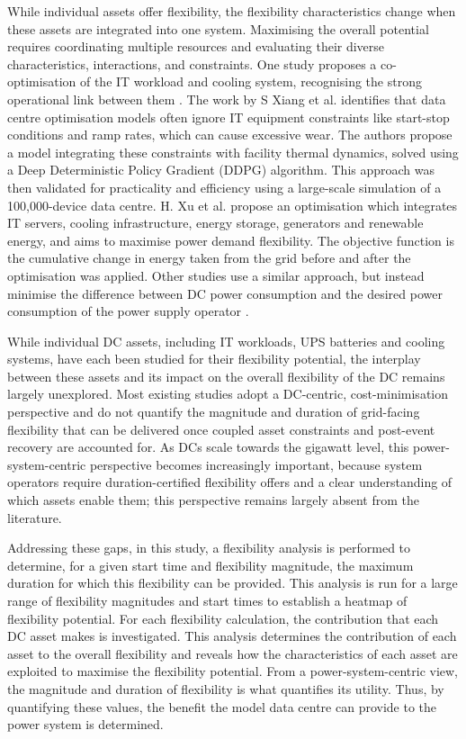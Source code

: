 \documentclass[lettersize,journal]{IEEEtran}
\newcommand{\rev}[1]{\textcolor{blue!70!black}{#1}}
\begin{document}
While individual assets offer flexibility, the flexibility characteristics change when these assets are integrated into one system. Maximising the overall potential requires coordinating multiple resources and evaluating their diverse characteristics, interactions, and constraints. One study proposes a co-optimisation of the IT workload and cooling system, recognising the strong operational link between them \cite{Fu2020ApEn}. The work by S Xiang et al. \cite{xiang2023modeling} identifies that data centre optimisation models often ignore IT equipment constraints like start-stop conditions and ramp rates, which can cause excessive wear. The authors propose a model integrating these constraints with facility thermal dynamics, solved using a Deep Deterministic Policy Gradient (DDPG) algorithm. This approach was then validated for practicality and efficiency using a large-scale simulation of a 100,000-device data centre.
H. Xu et al. \cite{Xu2023SPIE} propose an optimisation which integrates IT servers, cooling infrastructure, energy storage, generators and renewable energy, and aims to maximise power demand flexibility. The objective function is the cumulative change in energy taken from the grid before and after the optimisation was applied.
Other studies use a similar approach, but instead minimise the difference between DC power consumption and the desired power consumption of the power supply operator \cite{cioara2018optimized}. 

\rev{While individual DC assets, including IT workloads, UPS batteries and cooling systems, have each been studied for their flexibility potential, the interplay between these assets and its impact on the overall flexibility of the DC remains largely unexplored. Most existing studies adopt a DC-centric, cost-minimisation perspective and do not quantify the magnitude and duration of grid-facing flexibility that can be delivered once coupled asset constraints and post-event recovery are accounted for. As DCs scale towards the gigawatt level, this power-system-centric perspective becomes increasingly important, because system operators require duration-certified flexibility offers and a clear understanding of which assets enable them; this perspective remains largely absent from the literature.}

Addressing these gaps, in this study, a flexibility analysis is performed to determine, for a given start time and flexibility magnitude, the maximum duration for which this flexibility can be provided. This analysis is run for a large range of flexibility magnitudes and start times to establish a heatmap of flexibility potential. For each flexibility calculation, the contribution that each DC asset makes is investigated. This analysis determines the contribution of each asset to the overall flexibility and reveals how the characteristics of each asset are exploited to maximise the flexibility potential. From a power-system-centric view, the magnitude and duration of flexibility is what quantifies its utility. Thus, by quantifying these values, the benefit the model data centre can provide to the power system is determined. 
\end{document}
